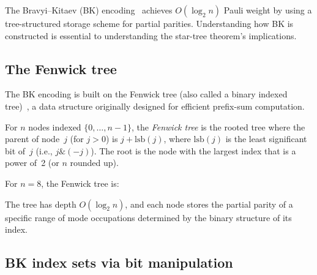 %

The Bravyi--Kitaev (BK) encoding~\cite{bravyi2002, seeley2012}
achieves $O(\log_2 n)$ Pauli weight by using a tree-structured storage
scheme for partial parities.  Understanding how BK is constructed is
essential to understanding the star-tree theorem's implications.

\subsection{The Fenwick tree}
\label{sec:fenwick-tree}

The BK encoding is built on the Fenwick tree (also called a binary
indexed tree)~\cite{fenwick1994}, a data structure originally designed
for efficient prefix-sum computation.

\begin{definition}
\label{def:fenwick-tree}
For $n$ nodes indexed $\{0, \ldots, n{-}1\}$, the \emph{Fenwick tree}
is the rooted tree where the parent of node~$j$ (for $j > 0$) is
$j + \mathrm{lsb}(j)$, where $\mathrm{lsb}(j)$ is the least
significant bit of~$j$ (i.e., $j \mathbin{\&} (-j)$).    The root is the
node with the largest index that is a power of~2 (or $n$ rounded up).
\end{definition}

For $n = 8$, the Fenwick tree is:
\begin{center}
\end{center}

The tree has depth $O(\log_2 n)$, and each node stores the partial
parity of a specific range of mode occupations determined by the
binary structure of its index.

\subsection{BK index sets via bit manipulation}
\label{sec:bk-bit-formulas}

